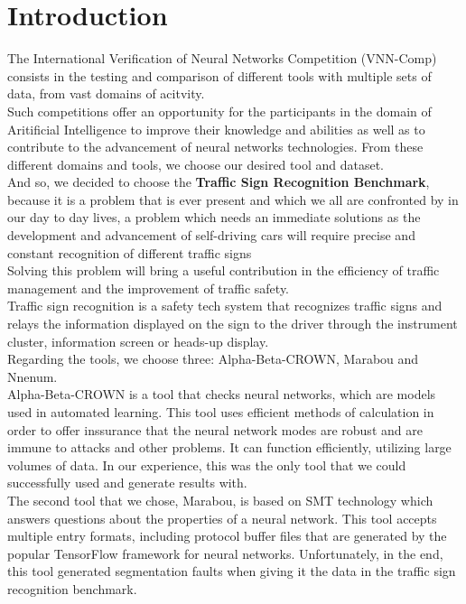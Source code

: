 \documentclass[12pt,a4paper]{report}
\begin{document}
\tableofcontents

\chapter{Introduction}
The International Verification of Neural Networks Competition (VNN-Comp) consists in the testing and comparison of different tools with multiple sets of data, from vast domains of acitvity.\\
Such competitions offer an opportunity for the participants in the domain of Aritificial Intelligence to improve their knowledge and abilities as well as to contribute to the advancement of neural networks technologies. From these different domains and tools, we choose our desired tool and dataset.\\
And so, we decided to choose the \textbf{Traffic Sign Recognition Benchmark}, because it is a problem that is ever present and which we all are confronted by in our day to day lives, a problem which needs an immediate solutions as the development and advancement of self-driving cars will require precise and constant recognition of different traffic signs \\
Solving this problem will bring a useful contribution in the efficiency of traffic management and the improvement of traffic safety.\\
Traffic sign recognition is a safety tech system that recognizes traffic signs and relays the information displayed on the sign to the driver through the instrument cluster, information screen or heads-up display.\\
Regarding the tools, we choose three: Alpha-Beta-CROWN, Marabou and Nnenum.\\
Alpha-Beta-CROWN is a tool that checks neural networks, which are models used in automated learning. This tool uses efficient methods of calculation in order to offer inssurance that the neural network modes are robust and are immune to attacks and other problems. It can function efficiently, utilizing large volumes of data. In our experience, this was the only tool that we could successfully used and generate results with.\\
The second tool that we chose, Marabou, is based on SMT technology which answers questions about the properties of a neural network. This tool accepts multiple entry formats, including protocol buffer files that are generated by the popular TensorFlow framework for neural networks. Unfortunately, in the end, this tool generated segmentation faults when giving it the data in the traffic sign recognition benchmark.\\
\end{document}
